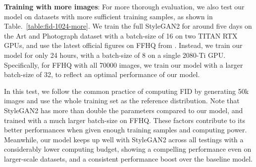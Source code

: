 \documentclass{article} \usepackage{iclr2021_conference,times}
\begin{document}
\begin{table}[h]
\vspace{-2mm}
\caption{FID comparison at $1024^2$ resolution on datasets with more images.}
\label{table:fid-1024-more}
\vspace{-2mm}
\begin{center}
\end{center}
\vspace{-0mm}

\end{table}

\textbf{Training with more images}: For more thorough evaluation, we also test our model on datasets with more sufficient training samples, as shown in Table.~\ref{table:fid-1024-more}. We train the full StyleGAN2 for around five days on the Art and Photograph dataset with a batch-size of 16 on two TITAN RTX GPUs, and use the latest official figures on FFHQ from \citeauthor{zhao2020differentiable}. Instead, we train our model for only 24 hours, with a batch-size of 8 on a single 2080-Ti GPU. Specifically, for FFHQ with all 70000 images, we train our model with a larger batch-size of 32, to reflect an optimal performance of our model. 

In this test, we follow the common practice of computing FID by generating 50k images and use the whole training set as the reference distribution. Note that StyleGAN2 has more than double the parameters compared to our model, and trained with a much larger batch-size on FFHQ. These factors contribute to its better performances when given enough training samples and computing power. Meanwhile, our model keeps up well with StyleGAN2 across all testings with a considerably lower computing budget, showing a compelling performance even on larger-scale datasets, and a consistent performance boost over the baseline model.
\end{document}
